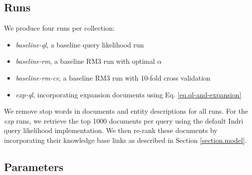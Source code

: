 \documentclass{article}
\begin{document}

\subsection{Runs}\label{section.evaluation.runs}


We produce four runs per collection:
\begin{itemize}
	\item \textit{baseline-ql}, a baseline query likelihood run
	\item \textit{baseline-rm}, a baseline RM3 run with optimal $\alpha$
	\item \textit{baseline-rm-cv}, a baseline RM3 run with 10-fold cross validation
	\item \textit{exp-ql}, incorporating expansion documents using Eq. \ref{eq.ql-and-expansion}
\end{itemize}

We remove stop words in documents and entity descriptions for all runs. For the \textit{exp} runs, we retrieve the top 1000 documents per query using the default Indri query likelihood implementation. We then re-rank these documents by incorporating their knowledge base links as described in Section \ref{section.model}.

\subsection{Parameters}\label{section.evaluation.parameters}
\end{document}
